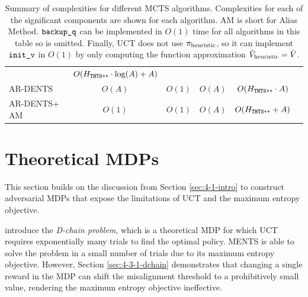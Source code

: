 \begin{table}[tbp]
{\begin{tabular}{l|ccccc}
                & $O(H_{{\textnormal{\texttt{THTS++}}}}\cdot \log(A)+A)$ \\
            AR-DENTS 
                & $O(A)$ 
                & $O(1)$ 
                & $O(A)$ 
                & $O(H_{{\textnormal{\texttt{THTS++}}}}\cdot A)$ \\
            AR-DENTS$+$AM 
                & $O(1)$ 
                & $O(1)$
                & $O(A)$ 
                & $O(H_{{\textnormal{\texttt{THTS++}}}}+A)$ \\
        \end{tabular}  
            }
        \caption[Summary of complexities for different MCTS algorithms.]{Summary of complexities for different MCTS algorithms. Complexities for each of the significant components are shown for each algorithm. AM is short for Alias Method. ${\textnormal{\texttt{backup\_q}}}$ can be implemented in $O(1)$ time for all algorithms in this table so is omitted. Finally, UCT does not use ${\pi_{\textnormal{heuristic}}}$, so it can implement ${\textnormal{\texttt{init\_v}}}$ in $O(1)$ by only computing the function approximation ${\hat{V}_{\textnormal{heuristic}}}=\tilde{V}$.
        \label{table:mcts_trial_complexity}}
    \end{table}

















\section{Theoretical MDPs}
\label{sec:4-3-toyenvs}

    This section builds on the discussion from Section \ref{sec:4-1-intro} to construct adversarial MDPs that expose the limitations of UCT and the maximum entropy objective.
    
    \citet{dchain} introduce the \textit{D-chain problem}, which is a theoretical MDP for which UCT requires exponentially many trials to find the optimal policy. MENTS is able to solve the problem in a small number of trials due to its maximum entropy objective. However, Section \ref{sec:4-3-1-dchain} demonstrates that changing a single reward in the MDP can shift the misalignment threshold to a prohibitively small value, rendering the maximum entropy objective ineffective.
    
